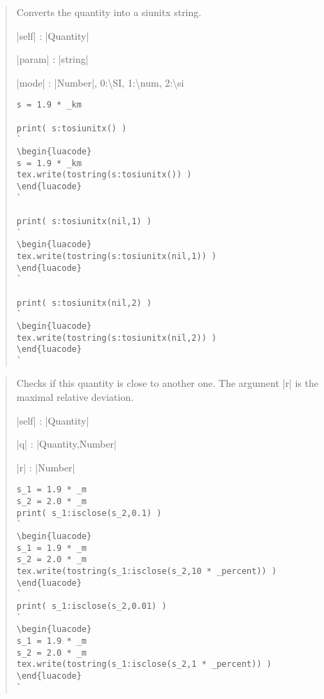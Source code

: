 \documentclass{ltxdoc}
\begin{document}
\begin{quote}
  Converts the quantity into a siunitx string.

  \begin{description}
  \item |self| : |Quantity| 
  \item |param| : |string|
  \item |mode| : |Number|, 0:\textbackslash SI, 1:\textbackslash num, 2:\textbackslash si
  \end{description}

\begin{lstlisting}
s = 1.9 * _km

print( s:tosiunitx() )
`
\begin{luacode}
s = 1.9 * _km
tex.write(tostring(s:tosiunitx()) )
\end{luacode}
`

print( s:tosiunitx(nil,1) )
`
\begin{luacode}
tex.write(tostring(s:tosiunitx(nil,1)) )
\end{luacode}
`

print( s:tosiunitx(nil,2) )
`
\begin{luacode}
tex.write(tostring(s:tosiunitx(nil,2)) )
\end{luacode}
`
\end{lstlisting}

\end{quote}






\begin{quote}
  Checks if this quantity is close to another one. The argument |r| is the maximal relative deviation.

  \begin{description}
  \item |self| : |Quantity| 
  \item |q| : |Quantity,Number| 
  \item |r| : |Number| 
  \end{description}

\begin{lstlisting}
s_1 = 1.9 * _m
s_2 = 2.0 * _m
print( s_1:isclose(s_2,0.1) )
`
\begin{luacode}
s_1 = 1.9 * _m
s_2 = 2.0 * _m
tex.write(tostring(s_1:isclose(s_2,10 * _percent)) )
\end{luacode}
`
print( s_1:isclose(s_2,0.01) )
`
\begin{luacode}
s_1 = 1.9 * _m
s_2 = 2.0 * _m
tex.write(tostring(s_1:isclose(s_2,1 * _percent)) )
\end{luacode}
`
\end{lstlisting}

\end{quote}
\end{document}
